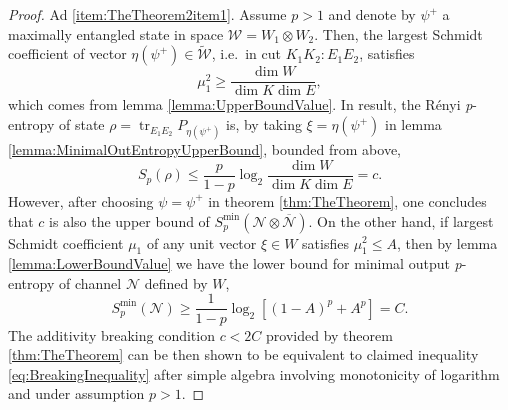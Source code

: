 \documentclass[reqno]{amsart}
\theoremstyle{plain}
\theoremstyle{note}
\newcommand{\ptr}[2]{\operatorname{tr}_{#1}{#2}}
\newcommand{\proj}[1]{P_{#1}}
\begin{document}
\begin{proof}
Ad \ref{item:TheTheorem2item1}. Assume $p > 1$ and denote by $\psi^+$ a maximally entangled state in space $\mathcal{W} = W_1 \otimes W_2$. Then, the largest Schmidt coefficient of vector $\eta(\psi^+) \in \tilde{\mathcal{W}}$, i.e.~in cut $K_1 K_2 : E_1 E_2$, satisfies
\begin{equation}
    \mu_{1}^{2} \geqslant \frac{\dim{W}}{\dim{K}\dim{E}},
\end{equation}
which comes from lemma \ref{lemma:UpperBoundValue}. In result, the R\'{e}nyi \textit{p}-entropy of state $\rho = \ptr{E_1 E_2}{\proj{\eta(\psi^+)}}$ is, by taking $\xi = \eta (\psi^+)$ in lemma \ref{lemma:MinimalOutEntropyUpperBound}, bounded from above,
\begin{equation}
    S_{p}(\rho) \leqslant \frac{p}{1-p} \log_{2}{\frac{\dim{W}}{\dim{K}\dim{E}}} = c.
\end{equation}
However, after choosing $\psi = \psi^+$ in theorem \ref{thm:TheTheorem}, one concludes that $c$ is also the upper bound of $S_{p}^{\mathrm{min}}(\mathcal{N} \otimes\overline{\mathcal{N}})$. On the other hand, if largest Schmidt coefficient $\mu_1$ of any unit vector $\xi \in W$ satisfies $\mu_{1}^{2} \leqslant A$, then by lemma \ref{lemma:LowerBoundValue} we have the lower bound for minimal output \textit{p}-entropy of channel $\mathcal{N}$ defined by $W$,
\begin{equation}
    S_{p}^{\mathrm{min}}(\mathcal{N}) \geqslant \frac{1}{1-p}\log_2 {\left[ (1-A)^p + A^p \right]} = C.
\end{equation}
The additivity breaking condition $c < 2C$ provided by theorem \ref{thm:TheTheorem} can be then shown to be equivalent to claimed inequality \eqref{eq:BreakingInequality} after simple algebra involving monotonicity of logarithm and under assumption $p > 1$.


\end{proof}
\end{document}

